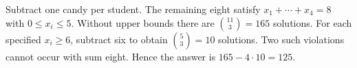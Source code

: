 Subtract one candy per student. The remaining eight satisfy $x_1+\cdots+x_4=8$ with $0\le x_i\le5$. Without upper bounds there are $\binom{11}3=165$ solutions. For each specified $x_i\ge6$, subtract six to obtain $\binom53=10$ solutions. Two such violations cannot occur with sum eight. Hence the answer is $165-4\cdot10=\boxed{125}$.
